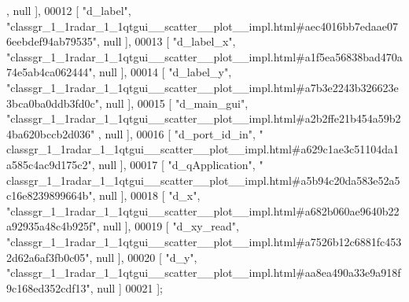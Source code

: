 \begin{DoxyCode}
      , null ],
00012     [ \textcolor{stringliteral}{"d\_label"}, \textcolor{stringliteral}{"classgr\_1\_1radar\_1\_1qtgui\_\_scatter\_\_plot\_\_impl.html#aec4016bb7edaae076eebdef94ab79535"}, 
      null ],
00013     [ \textcolor{stringliteral}{"d\_label\_x"}, \textcolor{stringliteral}{"classgr\_1\_1radar\_1\_1qtgui\_\_scatter\_\_plot\_\_impl.html#a1f5ea56838bad470a74e5ab4ca062444"},
       null ],
00014     [ \textcolor{stringliteral}{"d\_label\_y"}, \textcolor{stringliteral}{"classgr\_1\_1radar\_1\_1qtgui\_\_scatter\_\_plot\_\_impl.html#a7b3e2243b326623e3bca0ba0ddb3fd0c"},
       null ],
00015     [ \textcolor{stringliteral}{"d\_main\_gui"}, \textcolor{stringliteral}{"classgr\_1\_1radar\_1\_1qtgui\_\_scatter\_\_plot\_\_impl.html#a2b2ffe21b454a59b24ba620bccb2d036"}
      , null ],
00016     [ \textcolor{stringliteral}{"d\_port\_id\_in"}, \textcolor{stringliteral}{"
      classgr\_1\_1radar\_1\_1qtgui\_\_scatter\_\_plot\_\_impl.html#a629c1ae3c51104da1a585c4ac9d175c2"}, null ],
00017     [ \textcolor{stringliteral}{"d\_qApplication"}, \textcolor{stringliteral}{"
      classgr\_1\_1radar\_1\_1qtgui\_\_scatter\_\_plot\_\_impl.html#a5b94c20da583e52a5c16e8239899664b"}, null ],
00018     [ \textcolor{stringliteral}{"d\_x"}, \textcolor{stringliteral}{"classgr\_1\_1radar\_1\_1qtgui\_\_scatter\_\_plot\_\_impl.html#a682b060ae9640b22a92935a48c4b925f"}, null 
      ],
00019     [ \textcolor{stringliteral}{"d\_xy\_read"}, \textcolor{stringliteral}{"classgr\_1\_1radar\_1\_1qtgui\_\_scatter\_\_plot\_\_impl.html#a7526b12c6881fc4532d62a6af3fb0c05"},
       null ],
00020     [ \textcolor{stringliteral}{"d\_y"}, \textcolor{stringliteral}{"classgr\_1\_1radar\_1\_1qtgui\_\_scatter\_\_plot\_\_impl.html#aa8ea490a33e9a918f9c168ed352cdf13"}, null 
      ]
00021 ];
\end{DoxyCode}
